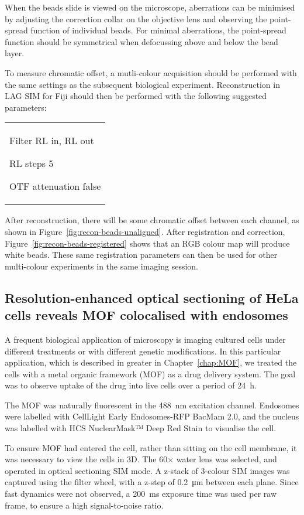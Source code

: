 When the beads slide is viewed on the microscope, aberrations can be minimised by adjusting the correction collar on the objective lens and observing the point-spread function of individual beads. 
For minimal aberrations, the point-spread function should be symmetrical when defocussing above and below the bead layer. 

To measure chromatic offset, a mutli-colour acquisition should be performed with the same settings as the subsequent biological experiment. 
Reconstruction in LAG SIM for Fiji should then be performed with the following suggested parameters: \newline
\begin{tabular}{p{}}
\begin{labelling}[margin=OTF attenuation]
	\item[Filter] RL in, RL out
	\item[RL steps] 5
	\item[OTF attenuation] false
\end{labelling}
\end{tabular}

After reconstruction, there will be some chromatic offset between each channel, as shown in Figure~\ref{fig:recon-beads-unaligned}. 
After registration and correction, Figure~\ref{fig:recon-beads-registered} shows that an RGB colour map will produce white beads. 
These same registration parameters can then be used for other multi-colour experiments in the same imaging session. 


\subsection{Resolution-enhanced optical sectioning of HeLa cells reveals MOF colocalised with endosomes}
A frequent biological application of microscopy is imaging cultured cells under different treatments or with different genetic modifications. 
In this particular application, which is described in greater in Chapter~\ref{chap:MOF}, we treated the cells with a metal organic framework (MOF) as a drug delivery system. 
The goal was to observe uptake of the drug into live cells over a period of \SI{24}{\hour}. 

The MOF was naturally fluorescent in the \SI{488}{\nano\metre} excitation channel. 
Endosomes were labelled with CellLight Early Endosomes-RFP BacMam 2.0, and the nucleus was labelled with HCS NuclearMask™ Deep Red Stain to visualise the cell. 

To ensure MOF had entered the cell, rather than sitting on the cell membrane, it was necessary to view the cells in 3D. 
The 60$\times$ water lens was selected, and operated in optical sectioning SIM mode. 
A z-stack of 3-colour SIM images was captured using the filter wheel, with a z-step of \SI{0.2}{\micro\metre} between each plane. 
Since fast dynamics were not observed, a \SI{200}{\milli\second} exposure time was used per raw frame, to ensure a high signal-to-noise ratio. 

